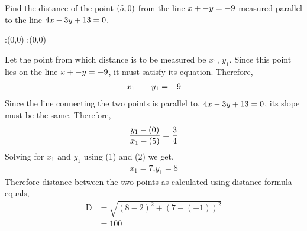 \question Find the distance of the point $(5, 0)$ from the line $ x + - y = -9$ measured parallel to the line $4 x -3 y + 13 = 0$.


\insertQR{}

\watchout

\ifprintanswers
  \begin{marginfigure}
      :(0,0)
      :(0,0)
    \figdrawbegin{}
      \figdrawline [100,101]
    \figdrawend
    \figvisu{\figBoxA}{}{%
    }
    \centerline{\box\figBoxA}
  \end{marginfigure}
\fi 

\begin{solution}
  Let the point from which distance is to be measured be $x_{1}$, $y_{1}$.
  Since this point lies on the line $ x + - y = -9$, it 
  must satisfy its equation. Therefore,
  \begin{align}
  	 x_{1} + - y_{1} = -9  	
  \end{align}  
  Since the line connecting the two points is parallel to, $4 x 
  -3 y + 13 = 0$, its slope must be the same. Therefore,
  \begin{align}
  	\dfrac{y_{1}-(0)}{x_{1}-(5)} = \dfrac{3}{4}
  \end{align}
  Solving for $x_{1}$ and $y_{1}$ using (1) and (2) we get,
  \begin{align}
  	x_{1} = 7 \text{,} y_{1} = 8 \nonumber
  \end{align}
  Therefore distance between the two points as calculated using
  distance formula equals,
  \begin{align}
  	\text{D} &= \sqrt{(8-2)^2+(7-(-1))^2} \nonumber \\
  			 &= 100 \nonumber
  \end{align}
\end{solution}
